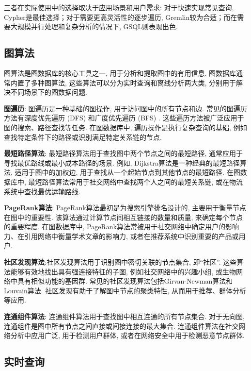 三者在实际使用中的选择取决于应用场景和用户需求: 对于快速实现常见查询, Cypher是最佳选择；对于需要更高灵活性的逐步遍历, Gremlin较为合适；而在需要大规模并行处理和复杂分析的情况下, GSQL则表现出色.

\vspace{1cm}
\subsection{图算法}

图算法是图数据库的核心工具之一, 用于分析和提取图中的有用信息. 图数据库通常内置了多种图算法, 这些算法可以分为实时查询和离线分析两大类, 分别用于解决不同场景下的图数据问题.

\textbf{图遍历}: 图遍历是一种基础的图操作, 用于访问图中的所有节点和边. 常见的图遍历方法有深度优先遍历 (DFS) 和广度优先遍历 (BFS) . 这些遍历方法被广泛应用于图的搜索、路径查找等任务. 在图数据库中, 遍历操作是执行复杂查询的基础, 例如查找特定条件下的路径或识别满足特定关系链的节点.

\textbf{最短路径算法}: 最短路径算法用于查找图中两个节点之间的最短路径, 通常应用于寻找最优路线或最小成本路径的场景. 例如, Dijkstra算法是一种经典的最短路径算法, 适用于图中的加权边, 用于查找从一个起始节点到其他节点的最短路径. 在图数据库中, 最短路径算法常用于社交网络中查找两个人之间的最短关系链, 或在物流系统中查找最优运输路线.

\textbf{PageRank算法}: PageRank算法最初是为搜索引擎排名设计的, 主要用于衡量节点在图中的重要性. 该算法通过计算节点间相互链接的数量和质量, 来确定每个节点的重要程度. 在图数据库中, PageRank算法常被用于社交网络中确定用户的影响力、在引用网络中衡量学术文章的影响力, 或者在推荐系统中识别重要的产品或用户.

\textbf{社区发现算法}:社区发现算法用于识别图中密切关联的节点集合, 即“社区”. 这些算法能够有效地找出具有强连接特征的子图, 例如社交网络中的兴趣小组, 或生物网络中具有相似功能的基因群. 常见的社区发现算法包括Girvan-Newman算法和Louvain算法. 社区发现有助于了解图中节点的聚类特性, 从而用于推荐、群体分析等应用.

\textbf{连通组件算法}: 连通组件算法用于查找图中相互连通的所有节点集合. 对于无向图, 连通组件是图中所有节点之间直接或间接连接的最大集合. 连通组件算法在社交网络分析中应用广泛, 用于检测用户群体, 或者在网络安全中用于检测恶意节点群体.



\vspace{1cm}
\subsection{实时查询}

